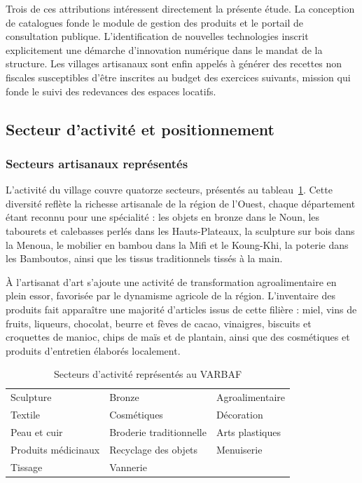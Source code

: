 Trois de ces attributions intéressent directement la présente étude. La conception de catalogues fonde le module de gestion des produits et le portail de consultation publique. L'identification de nouvelles technologies inscrit explicitement une démarche d'innovation numérique dans le mandat de la structure. Les villages artisanaux sont enfin appelés à générer des recettes non fiscales susceptibles d'être inscrites au budget des exercices suivants, mission qui fonde le suivi des redevances des espaces locatifs.

\subsection{Secteur d'activité et positionnement}

\subsubsection{Secteurs artisanaux représentés}

L'activité du village couvre quatorze secteurs, présentés au tableau~\ref{tab:secteurs}. Cette diversité reflète la richesse artisanale de la région de l'Ouest, chaque département étant reconnu pour une spécialité : les objets en bronze dans le Noun, les tabourets et calebasses perlés dans les Hauts-Plateaux, la sculpture sur bois dans la Menoua, le mobilier en bambou dans la Mifi et le Koung-Khi, la poterie dans les Bamboutos, ainsi que les tissus traditionnels tissés à la main.

À l'artisanat d'art s'ajoute une activité de transformation agroalimentaire en plein essor, favorisée par le dynamisme agricole de la région. L'inventaire des produits fait apparaître une majorité d'articles issus de cette filière : miel, vins de fruits, liqueurs, chocolat, beurre et fèves de cacao, vinaigres, biscuits et croquettes de manioc, chips de maïs et de plantain, ainsi que des cosmétiques et produits d'entretien élaborés localement.

\begin{table}[H]
\centering
\caption{Secteurs d'activité représentés au VARBAF}
\label{tab:secteurs}
\singlespacing
\begin{tabularx}{0.92\textwidth}{@{}XXX@{}}
\toprule
Sculpture & Bronze & Agroalimentaire\\
Textile & Cosmétiques & Décoration\\
Peau et cuir & Broderie traditionnelle & Arts plastiques\\
Produits médicinaux & Recyclage des objets & Menuiserie\\
Tissage & Vannerie & \\
\bottomrule
\end{tabularx}
\onehalfspacing
{}
\end{table}

